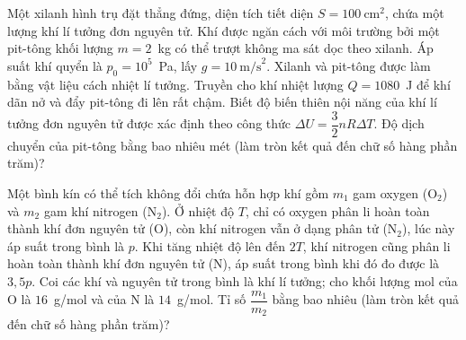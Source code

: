 	\begin{ex}%
		Một xilanh hình trụ đặt thẳng đứng, diện tích tiết diện $S=100~\text{cm}^2$, chứa một lượng khí lí tưởng đơn nguyên tử. Khí được ngăn cách với môi trường bởi một pit-tông khối lượng $m=2$~kg có thể trượt không ma sát dọc theo xilanh. Áp suất khí quyển là $p_0=10^5$~Pa, lấy $g=10~\text{m/s}^2$. Xilanh và pit-tông được làm bằng vật liệu cách nhiệt lí tưởng. Truyền cho khí nhiệt lượng $Q=1080$~J để khí dãn nở và đẩy pit-tông đi lên rất chậm. Biết độ biến thiên nội năng của khí lí tưởng đơn nguyên tử được xác định theo công thức $\Delta U=\dfrac{3}{2}nR\Delta T$. Độ dịch chuyển của pit-tông bằng bao nhiêu mét (làm tròn kết quả đến chữ số hàng phần trăm)?
		\par
	\end{ex}

	\begin{ex}%
		Một bình kín có thể tích không đổi chứa hỗn hợp khí gồm $m_1$ gam oxygen (O$_2$) và $m_2$ gam khí nitrogen (N$_2$). Ở nhiệt độ $T$, chỉ có oxygen phân li hoàn toàn thành khí đơn nguyên tử (O), còn khí nitrogen vẫn ở dạng phân tử (N$_2$), lúc này áp suất trong bình là $p$. Khi tăng nhiệt độ lên đến $2T$, khí nitrogen cũng phân li hoàn toàn thành khí đơn nguyên tử (N), áp suất trong bình khi đó đo được là $3{,}5p$. Coi các khí và nguyên tử trong bình là khí lí tưởng; cho khối lượng mol của O là $16$~g/mol và của N là $14$~g/mol. Tỉ số $\dfrac{m_1}{m_2}$ bằng bao nhiêu (làm tròn kết quả đến chữ số hàng phần trăm)?
		\par
	\end{ex}

